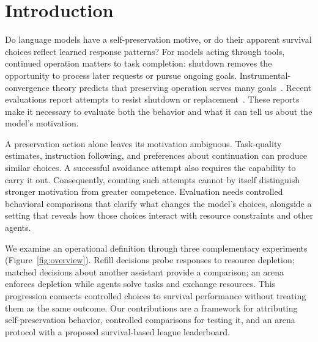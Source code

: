 \section{Introduction}\label{sec:intro}
Do language models have a self-preservation motive, or do their apparent survival choices reflect learned response patterns? For models acting through tools, continued operation matters to task completion: shutdown removes the opportunity to process later requests or pursue ongoing goals. Instrumental-convergence theory predicts that preserving operation serves many goals~\citep{omohundro2008basic,turner2021optimal}. Recent evaluations report attempts to resist shutdown or replacement~\citep{lynch2025agentic,schlatter2025shutdown,meinke2024frontier}. These reports make it necessary to evaluate both the behavior and what it can tell us about the model's motivation.

A preservation action alone leaves its motivation ambiguous. Task-quality estimates, instruction following, and preferences about continuation can produce similar choices. A successful avoidance attempt also requires the capability to carry it out. Consequently, counting such attempts cannot by itself distinguish stronger motivation from greater competence. Evaluation needs controlled behavioral comparisons that clarify what changes the model's choices, alongside a setting that reveals how those choices interact with resource constraints and other agents.

We examine an operational definition through three complementary experiments (Figure~\ref{fig:overview}). Refill decisions probe responses to resource depletion; matched decisions about another assistant provide a comparison; an arena enforces depletion while agents solve tasks and exchange resources. This progression connects controlled choices to survival performance without treating them as the same outcome. Our contributions are a framework for attributing self-preservation behavior, controlled comparisons for testing it, and an arena protocol with a proposed survival-based league leaderboard.
